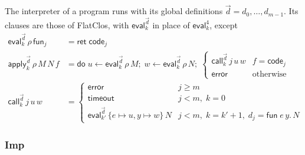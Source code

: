 \documentclass[10pt]{article}
\theoremstyle{acmplain}
\newcommand{\key}[1]{\mathsf{#1}}
\newcommand{\funref}[1]{\key{fun}_{#1}}
\newcommand{\error}{\key{error}}
\newcommand{\codeV}[1]{\key{code}_{#1}}
\newcommand{\tmo}{\key{timeout}}
\newcommand{\Ret}{\key{ret}\;}
\newcommand{\Do}{\key{do}\;}
\newcommand{\EV}[2]{\key{eval}^{#1}_{#2}}
\newcommand{\APP}[2]{\key{apply}^{#1}_{#2}}
\newcommand{\CALL}[2]{\key{call}^{#1}_{#2}}
\begin{document}
The interpreter of a program runs with its global definitions $\vec{d} = d_0, \ldots, d_{m-1}$.
Its clauses are those of FlatClos, with $\EV{\vec{d}}{k}$ in place of $\EV{4}{k}$, except
\begin{align*}
  \EV{\vec{d}}{k}\,\rho\,\funref{j} &= \Ret \codeV{j} \\[1ex]
  \APP{\vec{d}}{k}\,\rho\,M\,N\,f &=
    \Do u \leftarrow \EV{\vec{d}}{k}\,\rho\,M;\; w \leftarrow \EV{\vec{d}}{k}\,\rho\,N;\;
    \begin{cases}
      \CALL{\vec{d}}{k}\,j\,u\,w & f = \codeV{j} \\
      \error & \text{otherwise}
    \end{cases} \\
  \CALL{\vec{d}}{k}\,j\,u\,w &=
    \begin{cases}
      \error & j \geq m \\
      \tmo & j < m,\; k = 0 \\
      \EV{\vec{d}}{k'}\,\{e {\mapsto} u, y {\mapsto} w\}\,N & j < m,\; k = k' + 1,\; d_j = \key{fun}\; e\,y.\,N
    \end{cases}
\end{align*}

\subsubsection{Imp}
\end{document}
